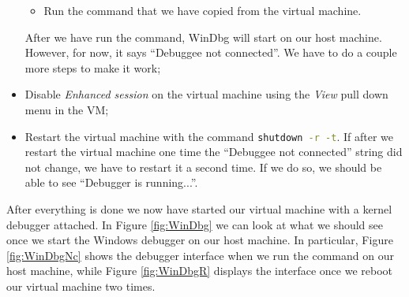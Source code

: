 \begin{itemize}
\begin{itemize}
			\item 
				Run the command that we have copied from the virtual machine.
		\end{itemize}
		After we have run the command, WinDbg will start on our host machine.
		However, for now, it says ``Debuggee not connected''.
		We have to do a couple more steps to make it work;
	\item 
		Disable \textit{Enhanced session} on the virtual machine using the \textit{View} pull down menu in the VM;
	\item 
		Restart the virtual machine with the command \colorbox{backcolour}{\lstinline[style=commandline, language=bash]|shutdown -r -t|}.
		If after we restart the virtual machine one time the ``Debuggee not connected'' string did not change, we have to restart it a second time.
		If we do so, we should be able to see ``Debugger is running...''.
\end{itemize}

After everything is done we now have started our virtual machine with a kernel debugger attached.
In Figure \ref{fig:WinDbg} we can look at what we should see once we start the Windows debugger on our host machine.
In particular, Figure \ref{fig:WinDbgNc} shows the debugger interface when we run the command on our host machine, while Figure \ref{fig:WinDbgR} displays the interface once we reboot our virtual machine two times.

